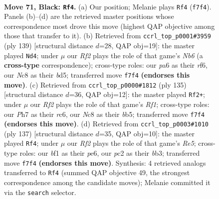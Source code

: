 \documentclass[11pt]{article}
\begin{document}
\clearpage

\begin{figure}[p]\centering
\begin{subfigure}{0.46\textwidth}\centering
\resizebox{\linewidth}{!}{%
\newchessgame
\chessboard[
  setfen={1Rn5/3k1r1p/P7/2P5/8/2p4P/2P3P1/4KB2 b - - 6 71},
  showmover=false,
  pgfstyle=straightmove, color=movearrow, markmove={f7-f4}
]}
\caption{}
\end{subfigure}\hfill
\begin{subfigure}{0.46\textwidth}\centering
\resizebox{\linewidth}{!}{%
\newchessgame
\chessboard[
  setfen={4k3/8/5R2/3Br1p1/2P3Pp/1n5P/7K/8 b - - 0 70},
  showmover=false,
  pgfstyle=straightmove, color=movearrow, markmove={b3-d4}
]}
\caption{}
\end{subfigure}
\\[4pt]
\begin{subfigure}{0.46\textwidth}\centering
\resizebox{\linewidth}{!}{%
\newchessgame
\chessboard[
  setfen={5r1k/1r6/2R3P1/1B1P4/P3p3/3nN3/7K/8 b - - 6 68},
  showmover=false,
  pgfstyle=straightmove, color=movearrow, markmove={f8-f2}
]}
\caption{}
\end{subfigure}\hfill
\begin{subfigure}{0.46\textwidth}\centering
\resizebox{\linewidth}{!}{%
\newchessgame
\chessboard[
  setfen={8/4k1p1/4P3/2K4P/1p2r1n1/1Bp5/P5R1/8 b - - 11 69},
  showmover=false,
  pgfstyle=straightmove, color=movearrow, markmove={e4-f4}
]}
\caption{}
\end{subfigure}
\caption{\textbf{Move 71, Black: \texttt{Rf4}.} (a) Our position; Melanie plays \texttt{Rf4} (\texttt{f7f4}). Panels (b)--(d) are the retrieved master positions whose correspondence most drove this move (highest QAP objective among those that transfer to it). (b) Retrieved from \texttt{ccrl\_top\_p0001\#3959} (ply 139) [structural distance $d$=28, QAP obj=19]: the master played \texttt{Nd4}; under $\mu$ our \emph{Rf2} plays the role of that game's \emph{Nb6} (a \textbf{cross-type} correspondence); cross-type roles: our \emph{p}a6 as their \emph{r}f6, our \emph{N}c8 as their \emph{b}d5; transferred move \texttt{f7f4} \textbf{(endorses this move)}. (c) Retrieved from \texttt{ccrl\_top\_p0000\#1812} (ply 135) [structural distance $d$=36, QAP obj=12]: the master played \texttt{Rf2+}; under $\mu$ our \emph{Rf2} plays the role of that game's \emph{Rf1}; cross-type roles: our \emph{P}h7 as their \emph{r}c6, our \emph{N}c8 as their \emph{b}b5; transferred move \texttt{f7f4} \textbf{(endorses this move)}. (d) Retrieved from \texttt{ccrl\_top\_p0003\#1010} (ply 137) [structural distance $d$=35, QAP obj=10]: the master played \texttt{Rf4}; under $\mu$ our \emph{Rf2} plays the role of that game's \emph{Re5}; cross-type roles: our \emph{b}f1 as their \emph{p}e6, our \emph{p}c2 as their \emph{b}b3; transferred move \texttt{f7f4} \textbf{(endorses this move)}. Synthesis: 4 retrieved analogs transferred to \texttt{Rf4} (summed QAP objective 49, the strongest correspondence among the candidate moves); Melanie committed it via the \texttt{search} selector.}
\label{fig:thought-m141}
\end{figure}
\end{document}
